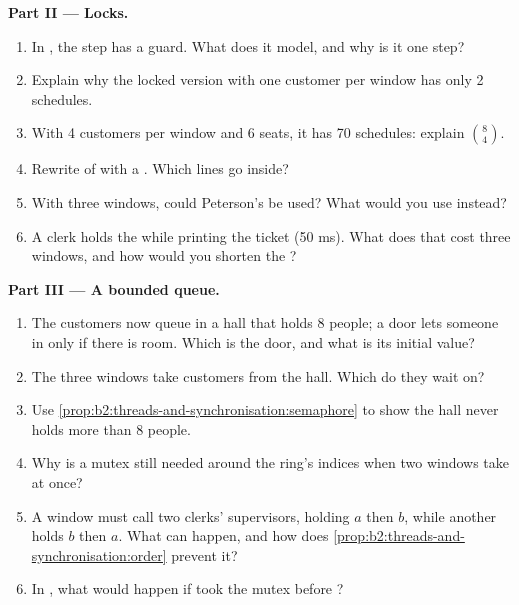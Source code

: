 \begin{problem}
\medskip\noindent\textbf{Part II --- Locks.}\par\nopagebreak
\begin{enumerate}[resume, beginpenalty=10000]
\item In , the  step has a guard. What does it model, and why is it one step?
\item Explain why the locked version with one customer per window has only 2 schedules.
\item With 4 customers per window and 6 seats, it has 70 schedules: explain $\binom{8}{4}$.
\item Rewrite  of  with a . Which lines go inside?
\item With three windows, could Peterson's  be used? What would you use instead?
\item A clerk holds the  while printing the ticket (50 ms). What does that cost three windows, and how would you
shorten the ?
\end{enumerate}

\medskip\noindent\textbf{Part III --- A bounded queue.}\par\nopagebreak
\begin{enumerate}[resume, beginpenalty=10000]
\item The customers now queue in a hall that holds 8 people; a door lets someone in only if there is room. Which
 is the door, and what is its initial value?
\item The three windows take customers from the hall. Which  do they wait on?
\item Use \cref{prop:b2:threads-and-synchronisation:semaphore} to show the hall never holds more than 8 people.
\item Why is a mutex still needed around the ring's indices when two windows take at once?
\item A window must call two clerks' supervisors, holding  $a$ then $b$, while another holds $b$ then $a$. What
can happen, and how does \cref{prop:b2:threads-and-synchronisation:order} prevent it?
\item In , what would happen if  took the mutex before ?
\end{enumerate}


\end{problem}
